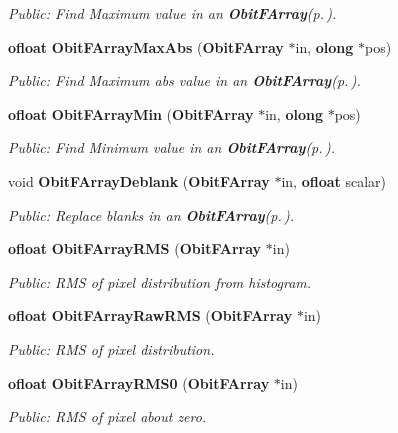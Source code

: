 \begin{CompactItemize}
\begin{CompactList}\small\item\em Public: Find Maximum value in an {\bf Obit\-FArray}{\rm (p.\,\pageref{structObitFArray})}. \item\end{CompactList}\item 
{\bf ofloat} {\bf Obit\-FArray\-Max\-Abs} ({\bf Obit\-FArray} $\ast$in, {\bf olong} $\ast$pos)
\begin{CompactList}\small\item\em Public: Find Maximum abs value in an {\bf Obit\-FArray}{\rm (p.\,\pageref{structObitFArray})}. \item\end{CompactList}\item 
{\bf ofloat} {\bf Obit\-FArray\-Min} ({\bf Obit\-FArray} $\ast$in, {\bf olong} $\ast$pos)
\begin{CompactList}\small\item\em Public: Find Minimum value in an {\bf Obit\-FArray}{\rm (p.\,\pageref{structObitFArray})}. \item\end{CompactList}\item 
void {\bf Obit\-FArray\-Deblank} ({\bf Obit\-FArray} $\ast$in, {\bf ofloat} scalar)
\begin{CompactList}\small\item\em Public: Replace blanks in an {\bf Obit\-FArray}{\rm (p.\,\pageref{structObitFArray})}. \item\end{CompactList}\item 
{\bf ofloat} {\bf Obit\-FArray\-RMS} ({\bf Obit\-FArray} $\ast$in)
\begin{CompactList}\small\item\em Public: RMS of pixel distribution from histogram. \item\end{CompactList}\item 
{\bf ofloat} {\bf Obit\-FArray\-Raw\-RMS} ({\bf Obit\-FArray} $\ast$in)
\begin{CompactList}\small\item\em Public: RMS of pixel distribution. \item\end{CompactList}\item 
{\bf ofloat} {\bf Obit\-FArray\-RMS0} ({\bf Obit\-FArray} $\ast$in)
\begin{CompactList}\small\item\em Public: RMS of pixel about zero. \item\end{CompactList}\item 

\end{CompactItemize}

